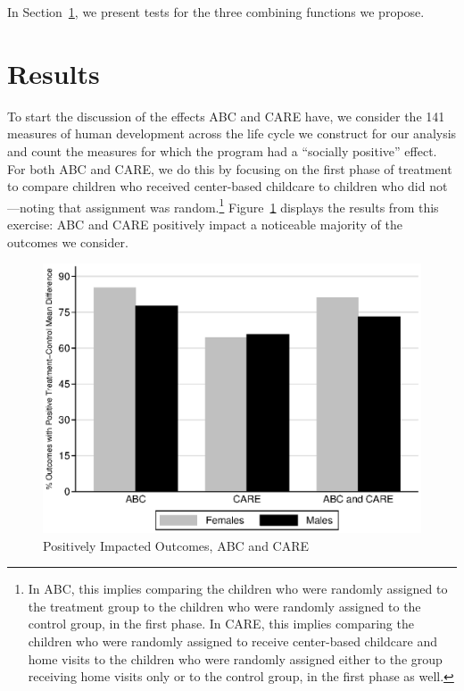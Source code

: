 \noindent In Section~\ref{section:results}, we present tests for the three combining functions we propose.

\section{Results} \label{section:results}

\noindent To start the discussion of the effects ABC and CARE have, we consider the 141 measures of human development across the life cycle we construct for our analysis and count the measures for which the program had a ``socially positive'' effect. For both ABC and CARE, we do this by focusing on the first phase of treatment to compare children who received center-based childcare to children who did not---noting that assignment was random.\footnote{In ABC, this implies comparing the children who were randomly assigned to the treatment group to the children who were randomly assigned to the control group, in the first phase. In CARE, this implies comparing the children who were randomly assigned to receive center-based childcare and home visits to the children who were randomly assigned either to the group receiving home visits only or to the control group, in the first phase as well.} Figure~\ref{fig:ppositive} displays the results from this exercise: ABC and CARE positively impact a noticeable majority of the outcomes we consider.

\begin{figure}[H]
		\caption{Positively Impacted Outcomes, ABC and CARE} \label{fig:ppositive}
		\includegraphics[width=.9\columnwidth]{output/abccare_positiveeffects.eps}
\end{figure}

